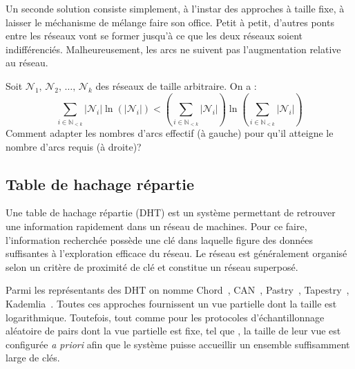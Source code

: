 Un seconde solution consiste simplement, à l'instar des approches à taille fixe,
à laisser le méchanisme de mélange faire son office. Petit à petit, d'autres
ponts entre les réseaux vont se former jusqu'à ce que les deux réseaux soient
indifférenciés. Malheureusement, les arcs ne suivent pas l'augmentation relative
au réseau.

\begin{problem}
  Soit $\mathcal{N}_1,\, \mathcal{N}_2,\, \ldots ,\, \mathcal{N}_k$ des réseaux
  de taille arbitraire. On a :
\begin{equation}
  \sum\limits_{i \in \mathbb{N}_{<k}} |\mathcal{N}_i|\ln (|\mathcal{N}_i|) < (\sum\limits_{i \in \mathbb{N}_{<k}} |\mathcal{N}_i|)\ln{(\sum\limits_{i \in \mathbb{N}_{<k}} |\mathcal{N}_i|)}
\end{equation}
Comment adapter les nombres d'arcs effectif (à gauche) pour qu'il atteigne le
nombre d'arcs requis (à droite)?
\end{problem}



\subsection{Table de hachage répartie}

Une table de hachage répartie (DHT) est un système permettant de retrouver une
information rapidement dans un réseau de machines. Pour ce faire, l'information
recherchée possède une clé dans laquelle figure des données suffisantes à
l'exploration efficace du réseau. Le réseau est généralement organisé selon un
critère de proximité de clé et constitue un réseau superposé. 

Parmi les représentants des DHT on nomme Chord~\cite{stoica2001chord},
CAN~\cite{ratnasamy2001scalable}, Pastry~\cite{rowstron2001pastry},
Tapestry~\cite{zhao2006tapestry}, Kademlia~\cite{maymounkov2002kademlia}.
Toutes ces approches fournissent un vue partielle dont la taille est
logarithmique. Toutefois, tout comme pour les protocoles d'échantillonnage
aléatoire de pairs dont la vue partielle est fixe, tel que \CYCLON, la taille de
leur vue est configurée \emph{a priori} afin que le système puisse accueillir un
ensemble suffisamment large de clés.

